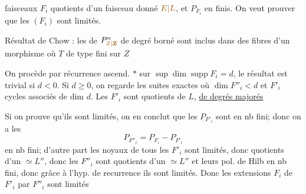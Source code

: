 faisceaux $F_i$ quotients d'un faisceau donné $\unsure{E|L}$, et  $P_{F_i}$ en  finis. On veut prouver que les $(F_i)$ sont limités. 

  Résultat de Chow : les  de $P^n_{\unsure{Z|\mathbf Z}}$ de  degré  borné sont inclus dans des fibres d'un
morphisme 
où $T$ de type fini sur $Z$

 On procède par récurrence ascend. $*$ sur $\sup\dim\operatorname{supp}F_i=d$, le résultat est trivial si $d<0$. Si $d\geq0$, on regarde les  suites exactes
 où $\dim F''_i<d$ et $F'_i$  cycles associés de dim $d$.
Les $F'_i$ sont quotients de $L$, \uline{de degrés majorés}

Si on prouve qu'ils sont limités, on en conclut que les  $P_{F'_i}$ sont en nb fini; donc on a les
\[
P_{F''_i}=P_{F_i}-P_{F'_i}
\]
en nb fini; d'autre part les noyaux de tous les $F'_i$ sont limités, donc quotients d'un $\simeq L''$, donc les $F''_i$ sont quotients d'un $\simeq L''$ et leurs pol. de Hilb en nb fini, donc  grâce à l'hyp. de recurrence ils sont limités. Donc les extensions $F_i$ de $F'_i$ par $F''_i$ sont limités
